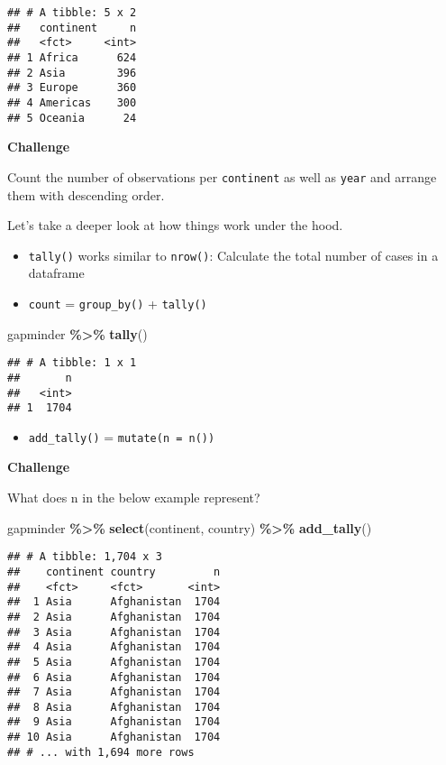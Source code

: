 \documentclass[
]{book}
\newenvironment{Shaded}{\begin{snugshade}}{\end{snugshade}}
\newcommand{\KeywordTok}[1]{\textcolor[rgb]{0.13,0.29,0.53}{\textbf{#1}}}
\newcommand{\NormalTok}[1]{#1}
\newcommand{\OperatorTok}[1]{\textcolor[rgb]{0.81,0.36,0.00}{\textbf{#1}}}
\newcommand{\StringTok}[1]{\textcolor[rgb]{0.31,0.60,0.02}{#1}}
\providecommand{\tightlist}{%
  \setlength{\itemsep}{0pt}\setlength{\parskip}{0pt}}
\begin{document}
\begin{verbatim}
## # A tibble: 5 x 2
##   continent     n
##   <fct>     <int>
## 1 Africa      624
## 2 Asia        396
## 3 Europe      360
## 4 Americas    300
## 5 Oceania      24
\end{verbatim}

\textbf{Challenge}

Count the number of observations per \texttt{continent} as well as \texttt{year} and arrange them with descending order.

Let's take a deeper look at how things work under the hood.

\begin{itemize}
\item
  \texttt{tally()} works similar to \texttt{nrow()}: Calculate the total number of cases in a dataframe
\item
  \texttt{count} = \texttt{group\_by()} + \texttt{tally()}
\end{itemize}

\begin{Shaded}
\begin{Highlighting}[]
\NormalTok{gapminder }\OperatorTok{\%\textgreater{}\%}
\StringTok{  }\KeywordTok{tally}\NormalTok{()}
\end{Highlighting}
\end{Shaded}

\begin{verbatim}
## # A tibble: 1 x 1
##       n
##   <int>
## 1  1704
\end{verbatim}

\begin{itemize}
\tightlist
\item
  \texttt{add\_tally()} = \texttt{mutate(n\ =\ n())}
\end{itemize}

\textbf{Challenge}

What does n in the below example represent?

\begin{Shaded}
\begin{Highlighting}[]
\NormalTok{gapminder }\OperatorTok{\%\textgreater{}\%}
\StringTok{  }\KeywordTok{select}\NormalTok{(continent, country) }\OperatorTok{\%\textgreater{}\%}
\StringTok{  }\KeywordTok{add\_tally}\NormalTok{()}
\end{Highlighting}
\end{Shaded}

\begin{verbatim}
## # A tibble: 1,704 x 3
##    continent country         n
##    <fct>     <fct>       <int>
##  1 Asia      Afghanistan  1704
##  2 Asia      Afghanistan  1704
##  3 Asia      Afghanistan  1704
##  4 Asia      Afghanistan  1704
##  5 Asia      Afghanistan  1704
##  6 Asia      Afghanistan  1704
##  7 Asia      Afghanistan  1704
##  8 Asia      Afghanistan  1704
##  9 Asia      Afghanistan  1704
## 10 Asia      Afghanistan  1704
## # ... with 1,694 more rows
\end{verbatim}
\end{document}
